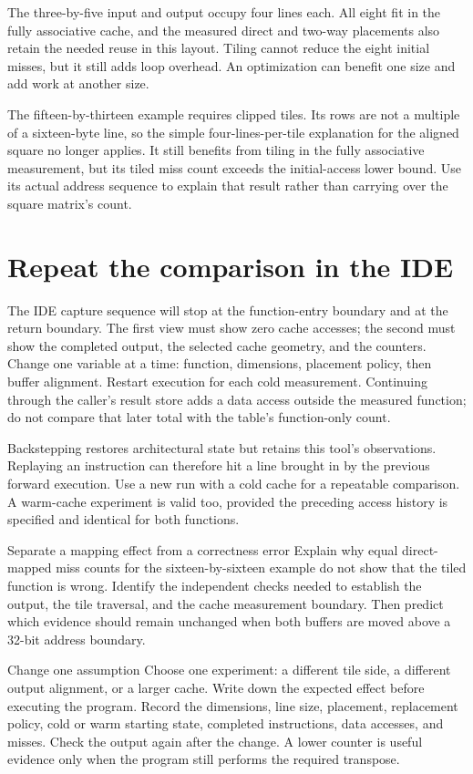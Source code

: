 The three-by-five input and output occupy four lines each. All eight fit in the
fully associative cache, and the measured direct and two-way placements also
retain the needed reuse in this layout. Tiling cannot reduce the eight initial
misses, but it still adds loop overhead. An optimization can benefit one size
and add work at another size.

The fifteen-by-thirteen example requires clipped tiles. Its rows are not a
multiple of a sixteen-byte line, so the simple four-lines-per-tile explanation
for the aligned square no longer applies. It still benefits from tiling in
the fully associative measurement, but its tiled miss count exceeds the
initial-access lower bound. Use its actual address sequence to explain that
result rather than carrying over the square matrix's count.

\section{Repeat the comparison in the IDE}
The IDE capture sequence will stop at the function-entry boundary and at the
return boundary. The first view must show zero cache accesses; the second must
show the completed output, the selected cache geometry, and the counters.
Change one variable at a time: function, dimensions, placement policy, then
buffer alignment. Restart execution for each cold measurement. Continuing
through the caller's result store adds a data access outside the measured
function; do not compare that later total with the table's function-only count.

Backstepping restores architectural state but retains this tool's observations.
Replaying an instruction can therefore hit a line brought in by the previous
forward execution. Use a new run with a cold cache for a repeatable comparison.
A warm-cache experiment is valid too, provided the preceding access history is
specified and identical for both functions.

\begin{MARSExercise}{Separate a mapping effect from a correctness error}
  Explain why equal direct-mapped miss counts for the sixteen-by-sixteen example
  do not show that the tiled function is wrong. Identify the independent checks
  needed to establish the output, the tile traversal, and the cache measurement
  boundary. Then predict which evidence should remain unchanged when both buffers
  are moved above a 32-bit address boundary.
\end{MARSExercise}

\begin{MARSExercise}{Change one assumption}
  Choose one experiment: a different tile side, a different output alignment, or
  a larger cache. Write down the expected effect before executing the program.
  Record the dimensions, line size, placement, replacement policy, cold or warm
  starting state, completed instructions, data accesses, and misses. Check the
  output again after the change. A lower counter is useful evidence only when
  the program still performs the required transpose.
\end{MARSExercise}
